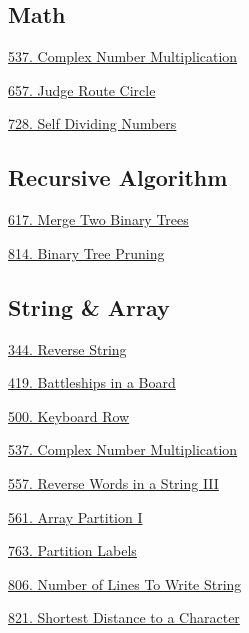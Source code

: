 \subsection*{Math}
\begin{flushleft}
    \hyperref[algo:537]{537. Complex Number Multiplication}

    \hyperref[algo:657]{657. Judge Route Circle}
    
    \hyperref[algo:728]{728. Self Dividing Numbers}
\end{flushleft}

\subsection*{Recursive Algorithm}
\begin{flushleft}
    \hyperref[algo:617]{617. Merge Two Binary Trees}

    \hyperref[algo:814]{814. Binary Tree Pruning}
\end{flushleft}

\subsection*{String \& Array}
\begin{flushleft}
    \hyperref[algo:344]{344. Reverse String}

    \hyperref[algo:419]{419. Battleships in a Board}

    \hyperref[algo:500]{500. Keyboard Row}

    \hyperref[algo:537]{537. Complex Number Multiplication}

    \hyperref[algo:557]{557. Reverse Words in a String III}

    \hyperref[algo:561]{561. Array Partition I}
    
    \hyperref[algo:763]{763. Partition Labels}
    
    \hyperref[algo:806]{806. Number of Lines To Write String}
    
    \hyperref[algo:821]{821. Shortest Distance to a Character}
\end{flushleft}
